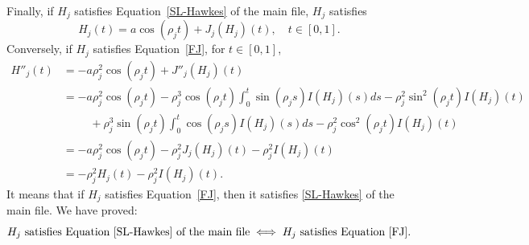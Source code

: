 \documentclass[aos]{imsart}
\theoremstyle{plain}
\theoremstyle{remark}
\newcommand{\1}{1}
\begin{document}
Finally, if $H_j$ satisfies Equation~\eqref{SL-Hawkes} of the main file, $H_j$ satisfies
\begin{equation}\label{FJ}
H_j(t)=a\cos (\rho_j t)+J_j(H_j)(t),\quad t\in [0,1].
\end{equation}
Conversely, if $H_j$ satisfies Equation~\eqref{FJ}, for $t\in [0,1]$, 
\begin{align*}
H''_j(t)&=-a\rho_j^2\cos (\rho_j t)+J''_j(H_j)(t)\\
&=-a\rho_j^2\cos (\rho_j t)-\rho_j^3\cos (\rho_j t)\int_0^t\sin (\rho_j s)I(H_j)(s)ds-\rho_j^2\sin^2(\rho_j t)I(H_j)(t)\\
&\hspace{1cm}+\rho_j^3\sin (\rho_j t)\int_0^t\cos (\rho_j s)I(H_j)(s)ds-\rho_j^2\cos^2 (\rho_j t)I(H_j)(t)\\
&=-a\rho_j^2\cos (\rho_j t)-\rho_j^2J_j(H_j)(t)-\rho_j^2I(H_j)(t)\\
&=-\rho_j^2H_j(t)-\rho_j^2I(H_j)(t).
\end {align*}
It means that if $H_j$ satisfies Equation~\eqref{FJ}, then it satisfies \eqref{SL-Hawkes} of the main file. We have proved:
\begin{equation}\label{equiv-equa}
H_j \mbox{ satisfies Equation \eqref{SL-Hawkes} of the main file} \iff H_j \mbox{ satisfies Equation  \eqref{FJ}} .
\end{equation}
\end{document}
